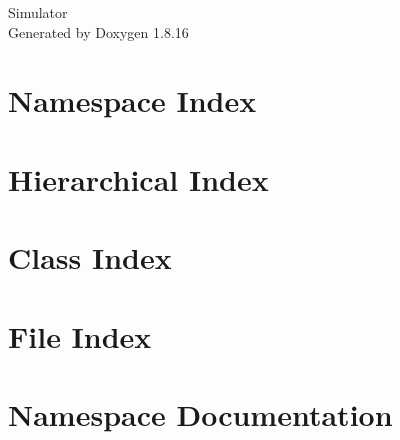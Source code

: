 \let\mypdfximage\pdfximage\def\pdfximage{\immediate\mypdfximage}\documentclass[twoside]{book}
\newcommand{\+}{\discretionary{\mbox{\scriptsize$\hookleftarrow$}}{}{}}
\newcommand{\clearemptydoublepage}{%
  \newpage{\pagestyle{empty}\cleardoublepage}%
}
\begin{document}
\hypersetup{pageanchor=false,
             bookmarksnumbered=true,
             pdfencoding=unicode
            }
\begin{titlepage}
\vspace*{7cm}
\begin{center}%
{\Large Simulator }\\
\vspace*{1cm}
{\large Generated by Doxygen 1.8.16}\\
\end{center}
\end{titlepage}
\clearemptydoublepage
{}
\tableofcontents
\clearemptydoublepage
{}
\hypersetup{pageanchor=true}

\chapter{Namespace Index}

\chapter{Hierarchical Index}

\chapter{Class Index}

\chapter{File Index}

\chapter{Namespace Documentation}

\end{document}
